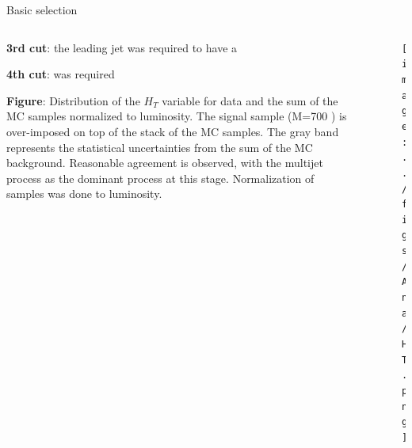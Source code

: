 \begin{frame}{Basic selection}
\vspace{-.2cm}

\begin{columns}
\begin{column}{.50\textwidth}
\begin{block}{}
\scriptsize \textbf{3rd cut}: the leading jet was required to have a 
\end{block}
\vspace{-.2cm}
\begin{block}{}
\scriptsize \textbf{4th cut}:  was required
\end{block}
\vspace{-.2cm}
\begin{block}{}
\scriptsize \textbf{Figure}: Distribution of the $H_{T}$ variable for data and the sum of the MC samples normalized to luminosity. The signal sample (M=700 \GeVcc) is over-imposed on top of the stack of the MC samples. The gray band represents the statistical uncertainties from the sum of the MC background. Reasonable agreement is observed, with the multijet process as the dominant process at this stage. Normalization of samples was done to luminosity.
\end{block}
\end{column}

\begin{column}{.50\textwidth}
\begin{figure}[!Hhtbp]
  \begin{center}
    \texttt{[image: ../figs/Ana/HT.png]}
  \end{center}
\end{figure}
\end{column}

\end{columns}
\end{frame}